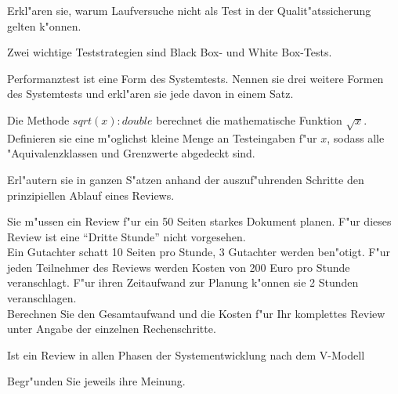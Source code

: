 \documentclass[12pt]{exam}
\begin{document}
\begin{questions}
\question[2] Erkl"aren sie, warum Laufversuche nicht als Test in der Qualit"atssicherung gelten k"onnen.
\addpoints

\question[2] Zwei wichtige Teststrategien sind Black Box- und White Box-Tests.
\noaddpoints
{}

\question[3] Performanztest ist eine Form des Systemtests. Nennen sie drei weitere Formen des Systemtests und erkl"aren sie jede davon in einem Satz.
\addpoints

\question[3] Die Methode $sqrt(x): double$ berechnet die mathematische Funktion $\sqrt{x}$. Definieren sie eine m"oglichst kleine Menge an Testeingaben f"ur $x$, sodass alle "Aquivalenzklassen und Grenzwerte abgedeckt sind.
\addpoints

\question[6] Erl"autern sie in ganzen S"atzen anhand der auszuf"uhrenden Schritte den prinzipiellen Ablauf eines Reviews.
\addpoints

\question[6] Sie m"ussen ein Review f"ur ein 50 Seiten starkes Dokument planen. F"ur dieses Review ist eine "`Dritte Stunde"' nicht vorgesehen. \\Ein Gutachter schatt 10 Seiten pro Stunde, 3 Gutachter werden ben"otigt. F"ur jeden Teilnehmer des Reviews werden Kosten von 200 Euro pro Stunde veranschlagt. F"ur ihren Zeitaufwand zur Planung k"onnen sie 2 Stunden veranschlagen. \\Berechnen Sie den Gesamtaufwand und die Kosten f"ur Ihr komplettes Review unter Angabe der einzelnen Rechenschritte.
\addpoints

\question[4] Ist ein Review in allen Phasen der Systementwicklung nach dem V-Modell
Begr"unden Sie jeweils ihre Meinung.


\end{questions}
\end{document}
